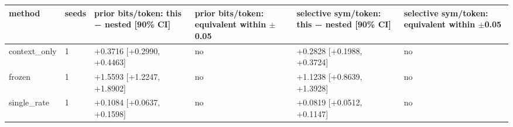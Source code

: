 \begin{tabular}{llllll}
\hline
method & seeds & prior bits/token: this − nested [90\% CI] & prior bits/token: equivalent within $\pm$0.05 & selective sym/token: this − nested [90\% CI] & selective sym/token: equivalent within $\pm$0.05 \\
\hline
context\_only & 1 & +0.3716 [+0.2990, +0.4463] & no & +0.2828 [+0.1988, +0.3724] & no \\
frozen & 1 & +1.5593 [+1.2247, +1.8902] & no & +1.1238 [+0.8639, +1.3928] & no \\
single\_rate & 1 & +0.1084 [+0.0637, +0.1598] & no & +0.0819 [+0.0512, +0.1147] & no \\
\hline
\end{tabular}
